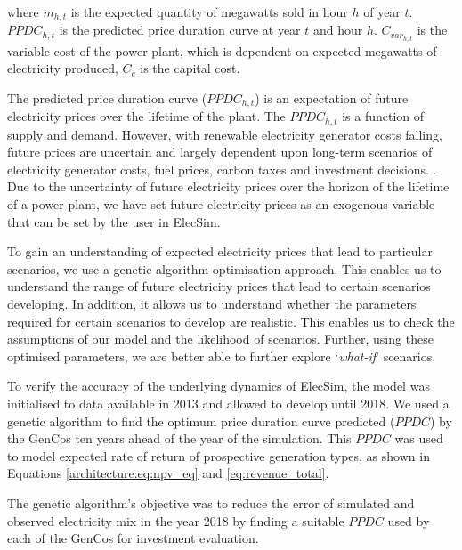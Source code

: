 \noindent where $m_{h,t}$ is the expected quantity of megawatts sold in hour $h$ of year $t$. $PPDC_{h,t}$ is the predicted price duration curve at year $t$ and hour $h$. $C_{var_{h,t}}$ is the variable cost of the power plant, which is dependent on expected megawatts of electricity produced, $C_c$ is the capital cost.

The predicted price duration curve ($PPDC_{h,t}$) is an expectation of future electricity prices over the lifetime of the plant. The $PPDC_{h,t}$ is a function of supply and demand. However, with renewable electricity generator costs falling, future prices are uncertain and largely dependent upon long-term scenarios of electricity generator costs, fuel prices, carbon taxes and investment decisions. \cite{IRENA2014}. Due to the uncertainty of future electricity prices over the horizon of the lifetime of a power plant, we have set future electricity prices as an exogenous variable that can be set by the user in ElecSim. 


To gain an understanding of expected electricity prices that lead to particular scenarios, we use a genetic algorithm optimisation approach. This enables us to understand the range of future electricity prices that lead to certain scenarios developing. In addition, it allows us to understand whether the parameters required for certain scenarios to develop are realistic. This enables us to check the assumptions of our model and the likelihood of scenarios. Further, using these optimised parameters, we are better able to further explore `\textit{what-if}' scenarios.















To verify the accuracy of the underlying dynamics of ElecSim, the model was initialised to data available in 2013 and allowed to develop until 2018. We used a genetic algorithm to find the optimum price duration curve predicted ($PPDC$) by the GenCos ten years ahead of the year of the simulation. This $PPDC$ was used to model expected rate of return of prospective generation types, as shown in Equations \ref{architecture:eq:npv_eq} and \ref{eq:revenue_total}. 

The genetic algorithm's objective was to reduce the error of simulated and observed electricity mix in the year 2018 by finding a suitable $PPDC$ used by each of the GenCos for investment evaluation.

